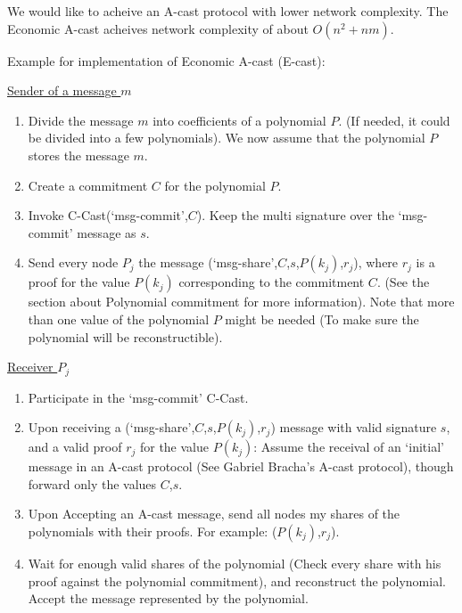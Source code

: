We would like to acheive an A-cast protocol with lower network complexity. The
Economic A-cast acheives network complexity of about $O(n^2 + nm)$.

Example for implementation of Economic A-cast (E-cast):

\uline{Sender of a message $m$}
\begin{enumerate}
  \item Divide the message $m$ into coefficients of a polynomial $P$. (If
    needed, it could be divided into a few polynomials). We now assume that the
    polynomial $P$ stores the message $m$.
  \item Create a commitment $C$ for the polynomial $P$.
  \item Invoke C-Cast(`msg-commit',$C$). Keep the multi signature over the
    `msg-commit' message as $s$.
  \item Send every node $P_j$ the message (`msg-share',$C$,$s$,$P(k_j)$,$r_j$),
    where $r_j$ is a proof for the value $P(k_j)$ corresponding to the
    commitment $C$. (See the section about Polynomial commitment for more
    information). Note that more than one value of the polynomial $P$ might be
    needed (To make sure the polynomial will be reconstructible).
\end{enumerate}

\uline{Receiver $P_j$}
\begin{enumerate}
  \item Participate in the `msg-commit' C-Cast.
  \item Upon receiving a (`msg-share',$C$,$s$,$P(k_j)$,$r_j$) message with valid
    signature $s$, and a valid proof $r_j$ for the value $P(k_j)$: Assume the
    receival of an `initial' message in an A-cast protocol (See Gabriel Bracha's
    A-cast protocol), though forward only the values $C$,$s$.
  \item Upon Accepting an A-cast message, send all nodes my shares of the
    polynomials with their proofs. For example: ($P(k_j)$,$r_j$).
  \item Wait for enough valid shares of the polynomial (Check every share with
    his proof against the polynomial commitment), and reconstruct the
    polynomial. Accept the message represented by the polynomial.
\end{enumerate}

